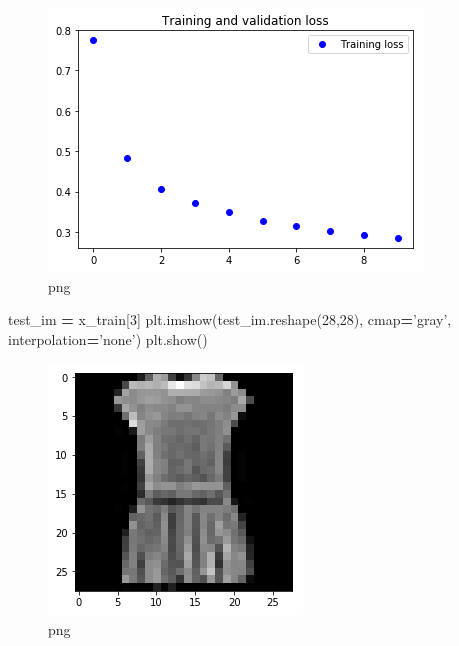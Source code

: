 \documentclass[]{book}
\newenvironment{Shaded}{\begin{snugshade}}{\end{snugshade}}
\newcommand{\DecValTok}[1]{\textcolor[rgb]{0.00,0.00,0.81}{#1}}
\newcommand{\StringTok}[1]{\textcolor[rgb]{0.31,0.60,0.02}{#1}}
\newcommand{\OperatorTok}[1]{\textcolor[rgb]{0.81,0.36,0.00}{\textbf{#1}}}
\newcommand{\NormalTok}[1]{#1}
\theoremstyle{definition}
\theoremstyle{definition}
\theoremstyle{definition}
\theoremstyle{remark}
\begin{document}
\begin{figure}
\centering
\includegraphics{output_10_1.png}
\caption{png}
\end{figure}

\begin{Shaded}
\begin{Highlighting}[]
\NormalTok{test_im }\OperatorTok{=}\NormalTok{ x_train[}\DecValTok{3}\NormalTok{]}
\NormalTok{plt.imshow(test_im.reshape(}\DecValTok{28}\NormalTok{,}\DecValTok{28}\NormalTok{), cmap}\OperatorTok{=}\StringTok{'gray'}\NormalTok{, interpolation}\OperatorTok{=}\StringTok{'none'}\NormalTok{)}
\NormalTok{plt.show()}
\end{Highlighting}
\end{Shaded}

\begin{figure}
\centering
\includegraphics{output_11_0.png}
\caption{png}
\end{figure}
\end{document}
